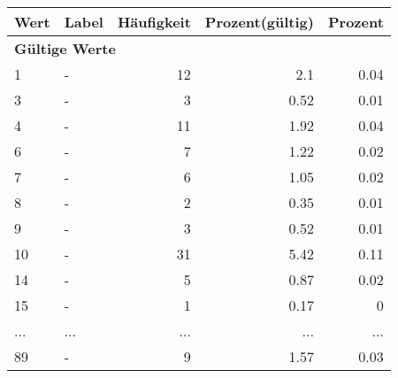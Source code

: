      \begin{longtable}{lXrrr}
     \toprule
     \textbf{Wert} & \textbf{Label} & \textbf{Häufigkeit} & \textbf{Prozent(gültig)} & \textbf{Prozent} \\
     \endhead
     \midrule
     \multicolumn{5}{l}{\textbf{Gültige Werte}}\\
        1 & \multicolumn{1}{X}{-} & %
          \num{12} &
          \num[round-mode=places,round-precision=2]{2,1} &
          \num[round-mode=places,round-precision=2]{0,04} \\
        3 & \multicolumn{1}{X}{-} & %
          \num{3} &
          \num[round-mode=places,round-precision=2]{0,52} &
          \num[round-mode=places,round-precision=2]{0,01} \\
        4 & \multicolumn{1}{X}{-} & %
          \num{11} &
          \num[round-mode=places,round-precision=2]{1,92} &
          \num[round-mode=places,round-precision=2]{0,04} \\
        6 & \multicolumn{1}{X}{-} & %
          \num{7} &
          \num[round-mode=places,round-precision=2]{1,22} &
          \num[round-mode=places,round-precision=2]{0,02} \\
        7 & \multicolumn{1}{X}{-} & %
          \num{6} &
          \num[round-mode=places,round-precision=2]{1,05} &
          \num[round-mode=places,round-precision=2]{0,02} \\
        8 & \multicolumn{1}{X}{-} & %
          \num{2} &
          \num[round-mode=places,round-precision=2]{0,35} &
          \num[round-mode=places,round-precision=2]{0,01} \\
        9 & \multicolumn{1}{X}{-} & %
          \num{3} &
          \num[round-mode=places,round-precision=2]{0,52} &
          \num[round-mode=places,round-precision=2]{0,01} \\
        10 & \multicolumn{1}{X}{-} & %
          \num{31} &
          \num[round-mode=places,round-precision=2]{5,42} &
          \num[round-mode=places,round-precision=2]{0,11} \\
        14 & \multicolumn{1}{X}{-} & %
          \num{5} &
          \num[round-mode=places,round-precision=2]{0,87} &
          \num[round-mode=places,round-precision=2]{0,02} \\
        15 & \multicolumn{1}{X}{-} & %
          \num{1} &
          \num[round-mode=places,round-precision=2]{0,17} &
          \num[round-mode=places,round-precision=2]{0} \\
       ... & ... & ... & ... & ... \\
        89 & \multicolumn{1}{X}{-} & %
          \num{9} &
          \num[round-mode=places,round-precision=2]{1,57} &
          \num[round-mode=places,round-precision=2]{0,03} \\


\end{longtable}
